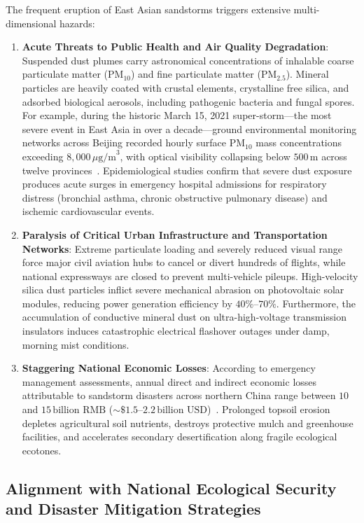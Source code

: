 The frequent eruption of East Asian sandstorms triggers extensive multi-dimensional hazards:
\begin{enumerate}
    \item \textbf{Acute Threats to Public Health and Air Quality Degradation}: Suspended dust plumes carry astronomical concentrations of inhalable coarse particulate matter ($\text{PM}_{10}$) and fine particulate matter ($\text{PM}_{2.5}$). Mineral particles are heavily coated with crustal elements, crystalline free silica, and adsorbed biological aerosols, including pathogenic bacteria and fungal spores. For example, during the historic March 15, 2021 super-storm—the most severe event in East Asia in over a decade—ground environmental monitoring networks across Beijing recorded hourly surface $\text{PM}_{10}$ mass concentrations exceeding $8{,}000\,\mu\text{g/m}^3$, with optical visibility collapsing below $500\,\text{m}$ across twelve provinces~\cite{ref2}. Epidemiological studies confirm that severe dust exposure produces acute surges in emergency hospital admissions for respiratory distress (bronchial asthma, chronic obstructive pulmonary disease) and ischemic cardiovascular events.
    \item \textbf{Paralysis of Critical Urban Infrastructure and Transportation Networks}: Extreme particulate loading and severely reduced visual range force major civil aviation hubs to cancel or divert hundreds of flights, while national expressways are closed to prevent multi-vehicle pileups. High-velocity silica dust particles inflict severe mechanical abrasion on photovoltaic solar modules, reducing power generation efficiency by $40\%\text{--}70\%$. Furthermore, the accumulation of conductive mineral dust on ultra-high-voltage transmission insulators induces catastrophic electrical flashover outages under damp, morning mist conditions.
    \item \textbf{Staggering National Economic Losses}: According to emergency management assessments, annual direct and indirect economic losses attributable to sandstorm disasters across northern China range between $10$ and $15\,\text{billion RMB}$ ($\sim \$1.5\text{--}2.2\,\text{billion USD}$)~\cite{ref2,ref7}. Prolonged topsoil erosion depletes agricultural soil nutrients, destroys protective mulch and greenhouse facilities, and accelerates secondary desertification along fragile ecological ecotones.
\end{enumerate}

\subsection{Alignment with National Ecological Security and Disaster Mitigation Strategies}
\label{subsec:national_strategy}

